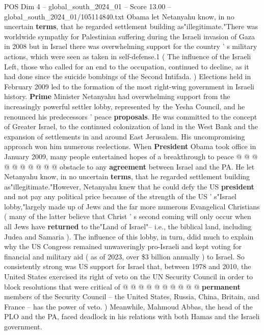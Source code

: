 \begin{textsample}{POS Dim 4 – global\_south\_2024\_01 – Score 13.00 – global\_south\_2024\_01/105114840.txt}  \label{ex:f4_pos_377}
Obama let Netanyahu know, in no uncertain \textbf{terms}, that he regarded settlement building as"illegitimate."There was worldwide sympathy for Palestinian suffering during the Israeli invasion of Gaza in 2008 but in Israel there was overwhelming support for the country ' s military actions, which were seen as taken in self-defense.1 ( The influence of the Israeli Left, those who called for an end to the occupation, continued to decline, as it had done since the suicide bombings of the Second Intifada. ) Elections held in February 2009 led to the formation of the most right-wing government in Israeli history. \textbf{Prime} Minister Netanyahu had overwhelming support from the increasingly powerful settler lobby, represented by the Yesha Council, and he renounced his predecessors ' peace \textbf{proposals}.
He was committed to the concept of Greater Israel, to the continued colonization of land in the West Bank and the expansion of settlements in and around East Jerusalem.
His uncompromising approach won him numerous reelections.
When \textbf{President} Obama took office in January 2009, many people entertained hopes of a breakthrough to peace @ @ @ @ @ @ @ @ @ @ obstacle to any \textbf{agreement} between Israel and the PA.
He let Netanyahu know, in no uncertain \textbf{terms}, that he regarded settlement building as"illegitimate."However, Netanyahu knew that he could defy the US \textbf{president} and not pay any political price because of the strength of the US ' s"Israel lobby,"largely made up of Jews and the far more numerous Evangelical Christians ( many of the latter believe that Christ ' s second coming will only occur when all Jews have \textbf{returned} to the"Land of Israel"-- i.e., the biblical land, including Judea and Samaria ).
The influence of this lobby, in turn, ddid much to explain why the US Congress remained unwaveringly pro-Israeli and kept voting for financial and military aid ( as of 2023, over \$3 billion annually ) to Israel.
So consistently strong was US support for Israel that, between 1978 and 2010, the United States exercised its right of veto on the UN Security Council in order to block resolutions that were critical of @ @ @ @ @ @ @ @ @ @ \textbf{permanent} members of the Security Council -- the United States, Russia, China, Britain, and France -- has the power of veto. ) Meanwhile, Mahmoud Abbas, the head of the PLO and the PA, faced deadlock in his relations with both Hamas and the Israeli government.

\end{textsample}
